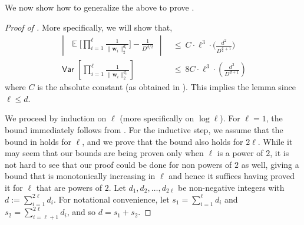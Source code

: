 \documentclass[11pt]{article}
\newcommand{\inparen}[1]{\left ( #1 \right )}
\newcommand{\insquare}[1]{\left [ #1 \right ]}
\newcommand{\inabs}[1]{\begin{vmatrix} #1 \end{vmatrix}}
\DeclareMathOperator*{\Ex}{\mathbb{E}}
\DeclareMathOperator*{\Var}{\mathsf{Var}}
\newcommand{\bw}{{\bm w}}
\begin{document}
\noindent We now show how to generalize the above to prove .

\begin{proof}[Proof of ]
	More specifically, we will show that,
	\begin{align}
	\inabs{\Ex\bigg[\prod\limits_{i=1}^{\ell} \frac{1}{\|\bw_i\|_2^{d_i}}\bigg] - \frac{1}{D^{d/2}}} &~\le~ C \cdot \ell^3 \cdot \bigg(\frac{d^2}{D^{\frac{d}{2}+1}} \bigg) \label{eq:exp_prod_dep}\\
	\Var\insquare{\prod\limits_{i=1}^{\ell} \frac{1}{\|\bw_i\|_2^{d_i}}} &~\le~ 8C \cdot \ell^3 \cdot \inparen{\frac{d^2}{D^{d+1}}}\label{eq:exp_prod_dep_var}
	\end{align}
	where $C$ is the absolute constant (as obtained in ). This implies the lemma since $\ell \le d$.
	
	We proceed by induction on $\ell$ (more specifically on $\log \ell$). For $\ell = 1$, the bound immediately follows from . For the inductive step, we assume that the bound in  holds for $\ell$, and we prove that the bound also holds for $2\ell$. While it may seem that our bounds are being proven only when $\ell$ is a power of $2$, it is not hard to see that our proof could be done for non powers of $2$ as well, giving a bound that is monotonically increasing in $\ell$ and hence it suffices having proved it for $\ell$ that are powers of $2$.	Let $d_1, d_2, \dots, d_{2\ell}$ be non-negative integers with $d:= \sum_{i=1}^{2\ell} d_i$. For notational convenience, let $s_1 = \sum_{i=1}^{\ell} d_i$ and $s_2 = \sum_{i=\ell+1}^{2\ell} d_i$, and so $d = s_1 + s_2$. %
	

\end{proof}
\end{document}
